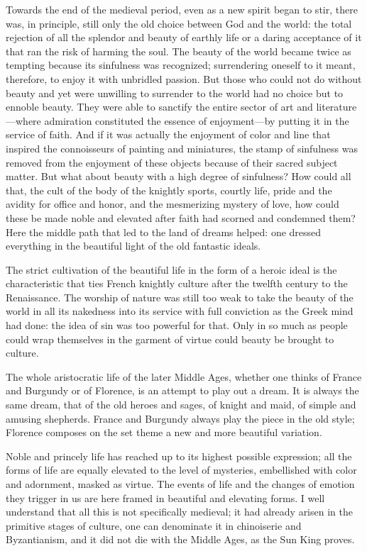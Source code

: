 Towards the end of the medieval period, even as a new spirit began to
stir, there was, in principle, still only the old choice between God and
the world: the total rejection of all the splendor and beauty of earthly
life or a daring acceptance of it that ran the risk of harming the soul.
The beauty of the world became twice as tempting because its sinfulness
was recognized; surrendering oneself to it meant, therefore, to enjoy it
with unbridled passion. But those who could not do without beauty and
yet were unwilling to surrender to the world had no choice but to
ennoble beauty. They were able to sanctify the entire sector of art and
literature---where admiration constituted the essence of enjoyment---by
putting it in the service of faith. And if it was actually the enjoyment
of color and line that inspired the connoisseurs of painting and
miniatures, the stamp of sinfulness was removed from the enjoyment of
these objects because of their sacred subject matter. But what about
beauty with a high degree of sinfulness? How could all that, the cult of
the body of the knightly sports, courtly life, pride and the avidity for
office and honor, and the mesmerizing mystery of love, how could these
be made noble and elevated after faith had scorned and condemned them?
Here the middle path that led to the land of dreams helped: one dressed
everything in the beautiful light of the old fantastic ideals.

The strict cultivation of the beautiful life in the form of a heroic
ideal is the characteristic that ties French knightly culture after the
twelfth century to the Renaissance. The worship of nature was still too
weak to take the beauty of the world in all its nakedness into
\protect\hypertarget{09_Chapter_Two__THE_CRAVING_FOR_A_M.xhtmlux5cux23page_42}{}{}its
service with full conviction as the Greek mind had done: the idea of sin
was too powerful for that. Only in so much as people could wrap
themselves in the garment of virtue could beauty be brought to culture.

The whole aristocratic life of the later Middle Ages, whether one thinks
of France and Burgundy or of Florence, is an attempt to play out a
dream. It is always the same dream, that of the old heroes and sages, of
knight and maid, of simple and amusing shepherds. France and Burgundy
always play the piece in the old style; Florence composes on the set
theme a new and more beautiful variation.

Noble and princely life has reached up to its highest possible
expression; all the forms of life are equally elevated to the level of
mysteries, embellished with color and adornment, masked as virtue. The
events of life and the changes of emotion they trigger in us are here
framed in beautiful and elevating forms. I well understand that all this
is not specifically medieval; it had already arisen in the primitive
stages of culture, one can denominate it in chinoiserie and
Byzantianism, and it did not die with the Middle Ages, as the Sun King
proves.

